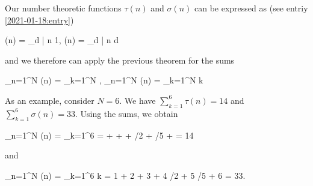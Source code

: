 Our number theoretic functions $\tau(n)$ and $\sigma(n)$ can be expressed as (see entriy \ref{2021-01-18:entry})

\bee
\tau(n) = \sum_{d | n} 1, \qquad \sigma(n) = \sum_{d | n} d
\eee

and we therefore can apply the previous theorem for the sums

\bee
\sum_{n=1}^N \tau(n) = \sum_{k=1}^N \left\lfloor {} \right\rfloor, \qquad \sum_{n=1}^N \sigma(n) = \sum_{k=1}^N k \left\lfloor {} \right\rfloor
\eee

As an example, consider $N = 6$. We have $\sum_{k=1}^6 \tau(n) = 14$ and $\sum_{k=1}^6 \sigma(n) = 33$. Using the sums, we obtain

\bee
\sum_{n=1}^N \tau(n) = \sum_{k=1}^6 \left\lfloor {} \right\rfloor =  \rfloor +  \rfloor +  \rfloor + /2 \rfloor + /5 \rfloor +  \rfloor = 14
\eee

and

\bee
\sum_{n=1}^N \sigma(n) = \sum_{k=1}^6 k \left\lfloor {} \right\rfloor = 1  \rfloor + 2  \rfloor + 3  \rfloor + 4 /2 \rfloor + 5 /5 \rfloor + 6  \rfloor = 33.
\eee



